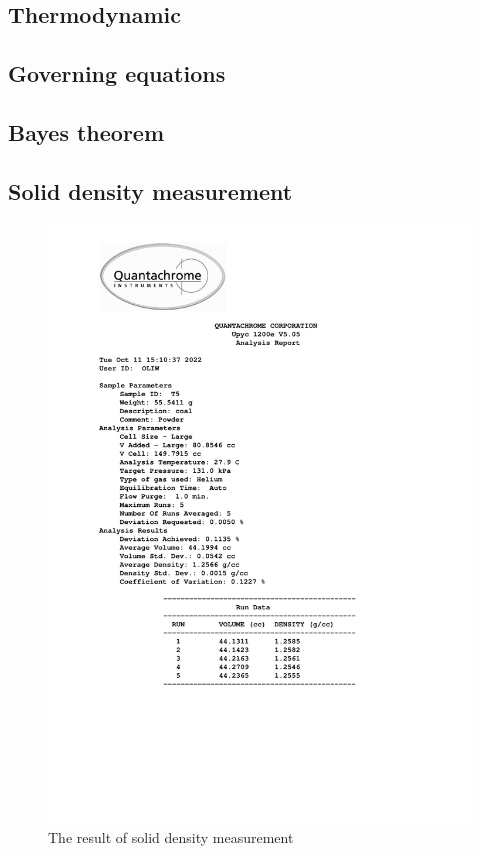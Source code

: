 \documentclass[a4paper,fleqn]{cas-dc}
\begin{document}
\subsection{Thermodynamic}

\subsection{Governing equations}


\subsection{Bayes theorem} \label{CH: Bayes}


\clearpage
\onecolumn
\subsection{Solid density measurement} \label{CH: Solid_Density_Measurment}

\begin{figure}[b!]
	\includegraphics[trim=0cm 6cm 0cm 0cm, clip,height=0.9\textheight]{Sections/ultraReportT5.pdf}
	\caption{The result of solid density measurement}
\end{figure}
\end{document}

